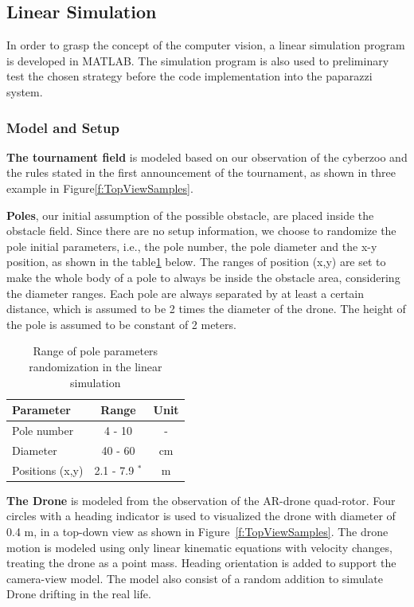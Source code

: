 \subsection{Linear Simulation}
\label{subsec:lin_sim}

In order to grasp the concept of the computer vision, a linear simulation program is developed in MATLAB. The simulation program is also used to preliminary test the chosen strategy before the code implementation into the paparazzi system.  

\subsubsection{Model and Setup}
\textbf{The tournament field} is modeled based on our observation of the cyberzoo and the rules stated in the first announcement of the tournament, as shown in three example in Figure\ref{f:TopViewSamples}.

\textbf{Poles}, our initial assumption of the possible obstacle, are placed inside the obstacle field. Since there are no setup information, we choose to randomize the pole initial parameters, i.e., the pole number, the pole diameter and the x-y position, as shown in the table\ref{t:RandomPole} below. The ranges of position (x,y) are set to make the whole body of a pole to always be inside the obstacle area, considering the diameter ranges. Each pole are always separated by at least a certain distance, which is assumed to be 2 times the diameter of the drone. The height of the pole is assumed  to be constant of 2 meters. 

\begin{table}
\caption{Range of pole parameters randomization in the linear simulation}
\label{t:RandomPole}
\begin{center}
\begin{tabular}{lcc}
\hline \hline
Parameter & Range & Unit \\\hline
Pole number & 4 - 10 & - \\
Diameter & 40 - 60 & cm \\
Positions (x,y) & 2.1 - 7.9 $^*$ & m \\\hline\hline
\end{tabular}
\end{center}

\end{table}

\textbf{The Drone} is modeled from the observation of the AR-drone quad-rotor. Four circles with a heading indicator is used to visualized the drone with diameter of 0.4 m, in a top-down view as shown in Figure~\ref{f:TopViewSamples}. The drone motion is modeled using only linear kinematic equations with velocity changes, treating the drone as a point mass. Heading orientation is added to support the camera-view model. The model also consist of a random addition to simulate Drone drifting in the real life. 

